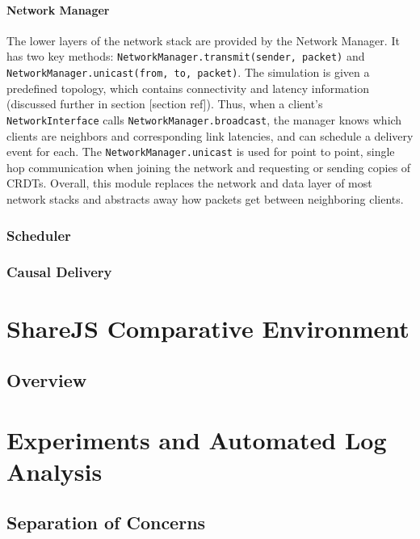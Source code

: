 \documentclass[12pt,a4paper,twoside,openright]{report}
\begin{document}
		
		
		\paragraph{Network Manager}
		The lower layers of the network stack are provided by the Network Manager. It has two key methods: \lstinline|NetworkManager.transmit(sender, packet)| and \lstinline|NetworkManager.unicast(from, to, packet)|. The simulation is given a predefined topology, which contains connectivity and latency information (discussed further in section [section ref]). Thus, when a client's \lstinline|NetworkInterface| calls \lstinline|NetworkManager.broadcast|, the manager knows which clients are neighbors and corresponding link latencies, and can schedule a delivery event for each. The \lstinline|NetworkManager.unicast| is used for point to point, single hop communication when joining the network and requesting or sending copies of CRDTs. Overall, this module replaces the network and data layer of most network stacks and abstracts away how packets get between neighboring clients.
		
		
		\subsubsection{Scheduler}
		
		
		
		\subsubsection{Causal Delivery}
	
\section{ShareJS Comparative Environment}

	\subsection{Overview}
	
\section{Experiments and Automated Log Analysis}

	\subsection{Separation of Concerns}
	
\end{document}
